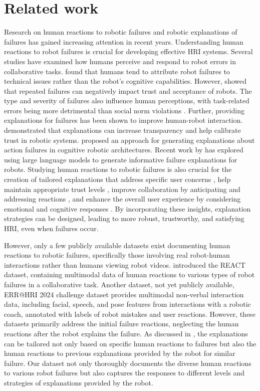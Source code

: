 \section{Related work}
Research on human reactions to robotic failures and robotic explanations of failures has gained increasing attention in recent years. 
Understanding human reactions to robot failures is crucial for developing effective HRI systems. Several studies have examined how humans perceive and respond to robot errors in collaborative tasks. \cite{mirnig2017understanding} found that humans tend to attribute robot failures to technical issues rather than the robot's cognitive capabilities. However, \cite{desai2013impact} showed that repeated failures can negatively impact trust and acceptance of robots. The type and severity of failures also influence human perceptions, with task-related errors being more detrimental than social norm violations \cite{salem2015err}. Further, providing explanations for failures has been shown to improve human-robot interaction. \cite{wang2016impact} demonstrated that explanations can increase transparency and help calibrate trust in robotic systems. \cite{thielstrom2020generating} proposed an approach for generating explanations about action failures in cognitive robotic architectures. Recent work by \cite{liu2023reflect} has explored using large language models to generate informative failure explanations for robots.
Studying human reactions to robotic failures is also crucial for the creation of tailored explanations that address specific user concerns \cite{kwon2018expressing}, help maintain appropriate trust levels \cite{wang2016impact}, improve collaboration by anticipating and addressing reactions \cite{tabrez2019reactive}, and enhance the overall user experience by considering emotional and cognitive responses \cite{spitale2024err}. By incorporating these insights, explanation strategies can be designed, leading to more robust, trustworthy, and satisfying HRI, even when failures occur.

However, only a few publicly available datasets exist documenting human reactions to robotic failures, specifically those involving real robot-human interactions rather than humans viewing robot videos.
\cite{stiber2023react} introduced the REACT dataset, containing multimodal data of human reactions to various types of robot failures in a collaborative task.
Another dataset, not yet publicly available, ERR@HRI 2024 challenge dataset \cite{spitale2024err} provides multimodal non-verbal interaction data, including facial, speech, and pose features from interactions with a robotic coach, annotated with labels of robot mistakes and user reactions. However, these datasets primarily address the initial failure reactions, neglecting the human reactions after the robot explains the failure. As discussed in \cite{tabrez2019reactive,spitale2024err}, the explanations can be tailored not only based on specific human reactions to failures but also the human reactions to previous explanations provided by the robot for similar failure. Our dataset not only thoroughly documents the diverse human reactions to various robot failures but also captures the responses to different levels and strategies of explanations provided by the robot.